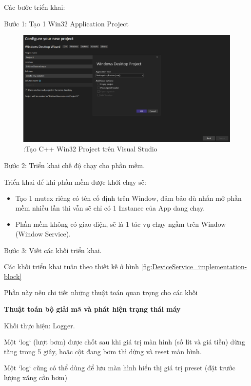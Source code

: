 Các bước triển khai:

Bước 1: Tạo 1 Win32 Application Project

\begin{figure}[!ht]
     \centering
    \includegraphics[width=1\linewidth]{Figures/DeviceService-create-project.png}
    \caption{:Tạo C++ Win32 Project trên Visual Studio}
    \label{fig:Tạo C++ Win32 Project trên Visual Studio}
\end{figure}

Bước 2: Triển khai chế độ chạy cho phần mềm.

Triển khai để khi phần mềm được khởi chạy sẽ:
\begin{itemize}
    \item Tạo 1 mutex riêng có tên cố định trên Window, đảm bảo dù nhấn mở phần mềm nhiều lần thì vẫn sẽ chỉ có 1 Instance của App đang chạy.
    \item Phần mềm không có giao diện, sẽ là 1 tác vụ chạy ngầm trên Window (Window Service).

\end{itemize}

Bước 3: Viết các khối triển khai.

Các khối triển khai tuân theo thiết kế ở hình \ref{fig:DeviceService_implementation-block}

Phần này nêu chi tiết những thuật toán quan trọng cho các khối

\textbf{Thuật toán bộ giải mã và phát hiện trạng thái máy} 

Khối thực hiện: Logger.

Một `log` (lượt bơm) được chốt sau khi giá trị màn hình (số lít và giá tiền) dừng tăng trong 5 giây, hoặc cột đang bơm thì dừng và reset màn hình.

Một `log` cũng có thể dùng để lưu màn hình hiển thị giá trị preset (đặt trước lượng xăng cần bơm)

